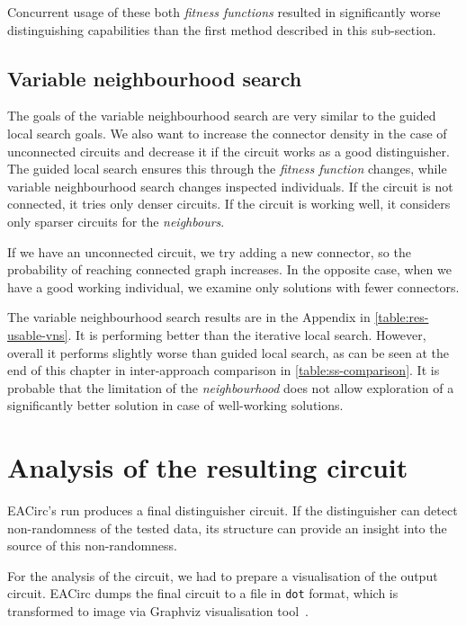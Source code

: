 \documentclass[
    digital,    %
    oneside,    %
    color,
    11pt,
    nocover,
    notable,
    nolof,
    nolot,
]{fithesis3}
\begin{document}
Concurrent usage of these both \textit{fitness functions} resulted in significantly worse distinguishing capabilities than the first method described in this sub-section.


\subsection{Variable neighbourhood search}
\label{subsec:res-ss-vns}

The goals of the variable neighbourhood search are very similar to the guided local search goals. We also want to increase the connector density in the case of unconnected circuits and decrease it if the circuit works as a good distinguisher. The guided local search ensures this through the \textit{fitness function} changes, while variable neighbourhood search changes inspected individuals. If the circuit is not connected, it tries only denser circuits. If the circuit is working well, it considers only sparser circuits for the \textit{neighbours}.

If we have an unconnected circuit, we try adding a new connector, so the probability of reaching connected graph increases. In the opposite case, when we have a good working individual, we examine only solutions with fewer connectors.

The variable neighbourhood search results are in the Appendix in \cref{table:res-usable-vns}. It is performing better than the iterative local search. However, overall it performs slightly worse than guided local search, as can be seen at the end of this chapter in inter-approach comparison in \cref{table:ss-comparison}. It is probable that the limitation of the \textit{neighbourhood} does not allow exploration of a significantly better solution in case of well-working solutions.


\section{Analysis of the resulting circuit}
\label{sec:res-circ-anal}

EACirc's run produces a final distinguisher circuit. If the distinguisher can detect non-randomness of the tested data, its structure can provide an insight into the source of this non-randomness.

For the analysis of the circuit, we had to prepare a visualisation of the output circuit. EACirc dumps the final circuit to a file in \texttt{dot} format, which is transformed to image via Graphviz visualisation tool~\cite{ellson2001graphviz}.
\end{document}
